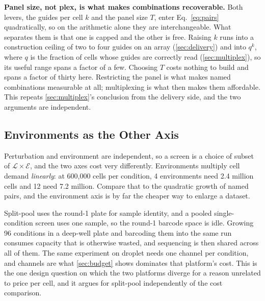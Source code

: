\begin{keybox}
\textbf{Panel size, not plex, is what makes combinations recoverable.} Both
levers, the guides per cell $k$ and the panel size $T$, enter
Eq.~\ref{eq:pairs} quadratically, so on the arithmetic alone they are
interchangeable. What separates them is that one is capped and the other is
free. Raising $k$ runs into a construction ceiling of two to four guides on an
array (\cref{sec:delivery}) and into $q^{k}$, where $q$ is the fraction of cells
whose guides are correctly read (\cref{sec:multiplex}), so its useful range spans
a factor of a few. Choosing $T$ costs nothing to build and spans a factor of
thirty here. Restricting the
panel is what makes named combinations measurable at all; multiplexing is what
then makes them affordable. This repeats \cref{sec:multiplex}'s conclusion from
the delivery side, and the two arguments are independent.
\end{keybox}

\subsection{Environments as the Other Axis}
\label{sec:environments}

Perturbation and environment are independent, so a screen is a choice of subset
of $\mathcal{L}\times\mathcal{E}$, and the two axes cost very differently.
Environments multiply cell demand \emph{linearly}: at 600{,}000 cells per
condition, 4 environments need 2.4 million cells and 12 need 7.2 million.
Compare that to the quadratic growth of named pairs, and the environment axis is
by far the cheaper way to enlarge a dataset.

 Split-pool
uses the round-1 plate for sample identity, and a pooled single-condition screen
uses one sample, so the round-1 barcode space is idle. Growing 96 conditions in a
deep-well plate and barcoding them into the same run consumes capacity that is
otherwise wasted, and sequencing is then shared across all of them. The same
experiment on droplet needs one channel per condition, and channels are what
\cref{sec:budget} shows dominates that platform's cost. This is the one design
question on which the two platforms diverge for a reason unrelated to price per
cell, and it argues for split-pool independently of the cost comparison.

